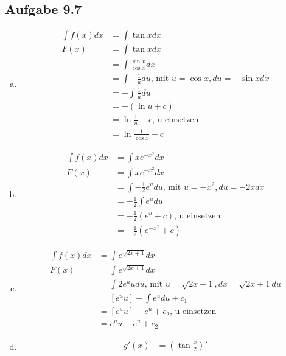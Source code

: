 \documentclass{standalone}
\begin{document}
\subsection{Aufgabe 9.7}

\begin{enumerate}[a)]
    \item \begin{align}
        \int f(x) dx &= \int \tan x dx \\
        F(x) &= \int \tan x  dx \\
        &= \int \frac{\sin x}{\cos x} dx \\
        &= \int -\frac{1}{u} du \text{, mit } u = \cos x, du = -\sin x dx \\
        &= -\int \frac{1}{u} du \\
        &= - (\ln u + c) \\
        &= \ln \frac{1}{u} - c \text{, u einsetzen} \\
        &= \ln \frac{1}{\cos x} - c
    \end{align}
    \item \begin{align}
        \int f(x) dx &= \int xe^{-x^2} dx \\
        F(x) &= \int xe^{-x^2} dx \\
        &= \int -\frac{1}{2}e^{u} du \text{, mit } u = -x^2, du = -2x dx \\
        &= -\frac{1}{2} \int e^{u} du \\
        &= -\frac{1}{2} (e^{u} + c) \text{, u einsetzen} \\
        &= -\frac{1}{2} (e^{-x^2} + c)
    \end{align}
    \item \begin{align}
        \int f(x) dx &= \int e^{\sqrt{2x+1}} dx \\
        F(x) = &= \int e^{\sqrt{2x+1}} dx\\
        &= \int 2e^{u}u du \text{, mit } u = \sqrt{2x+1}, dx = \sqrt{2x+1} du \\
        &= \left[ e^{u}u \right] - \int e^{u} du + c_1 \\
        &= \left[ e^{u}u \right] - e^{u} + c_2 \text{, u einsetzen} \\
        &= e^{u}u - e^{u} + c_2
    \end{align}
    \item \begin{align}
        g'(x) &= (\tan \frac{x}{2})' \\

\end{align}
\end{enumerate}
\end{document}
